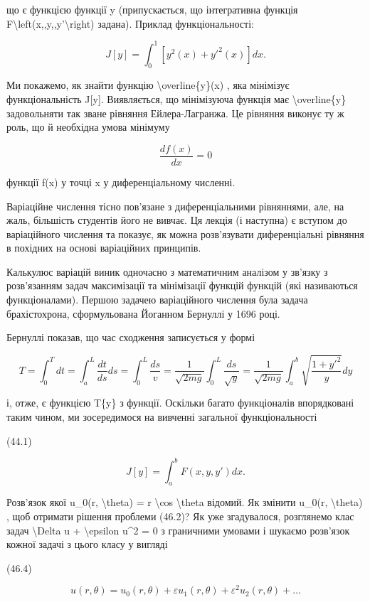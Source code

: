 \documentclass[
]{article}
\begin{document}
що є функцією функції y (припускається, що інтегративна функція
F\textbackslash left(x,,y,,y'\textbackslash right) задана). Приклад
функціональності:

\[
J[y] = \int_{0}^{1} [y^{2}(x) + y'^{2}(x)] dx.
\]

Ми покажемо, як знайти функцію \textbackslash overline\{y\}(x) , яка
мінімізує функціональність J{[}y{]}. Виявляється, що мінімізуюча функція
має \textbackslash overline\{y\} задовольняти так зване рівняння
Ейлера-Лагранжа. Це рівняння виконує ту ж роль, що й необхідна умова
мінімуму

\[
\frac{df(x)}{dx} = 0
\]

функції f(x) у точці x у диференціальному численні.

Варіаційне числення тісно пов'язане з диференціальними рівняннями, але,
на жаль, більшість студентів його не вивчає. Ця лекція (і наступна) є
вступом до варіаційного числення та показує, як можна розв'язувати
диференціальні рівняння в похідних на основі варіаційних принципів.

Калькулюс варіацій виник одночасно з математичним аналізом у зв'язку з
розв'язанням задач максимізації та мінімізації функцій функцій (які
називаються функціоналами). Першою задачею варіаційного числення була
задача брахістохрона, сформульована Йоганном Бернуллі у 1696 році.

Бернуллі показав, що час сходження записується у формі

\[
T = \int_{0}^{T} dt = \int_{a}^{L} \frac{dt}{ds} ds = \int_{0}^{L} \frac{ds}{v} = \frac{1}{\sqrt{2mg}} \int_{0}^{L} \frac{ds}{\sqrt{y}} = \frac{1}{\sqrt{2mg}} \int_{a}^{b} \sqrt{\frac{1+y'^{2}}{y}} dy
\]

і, отже, є функцією T\{y\} з функції. Оскільки багато функціоналів
впорядковані таким чином, ми зосередимося на вивченні загальної
функціональності

(44.1)

\[
J[y] = \int_{a}^{b} F(x, y, y') dx.
\]

Розв'язок якої u\_0(r, \textbackslash theta) = r \textbackslash cos
\textbackslash theta відомий. Як змінити u\_0(r, \textbackslash theta) ,
щоб отримати рішення проблеми (46.2)? Як уже згадувалося, розглянемо
клас задач \textbackslash Delta u + \textbackslash epsilon u\^{}2 = 0 з
граничними умовами і шукаємо розв'язок кожної задачі з цього класу у
вигляді

(46.4)

\[
u(r, \theta) = u_0(r, \theta) + \varepsilon u_1(r, \theta) + \varepsilon^2 u_2(r, \theta) + \dots
\]
\end{document}
